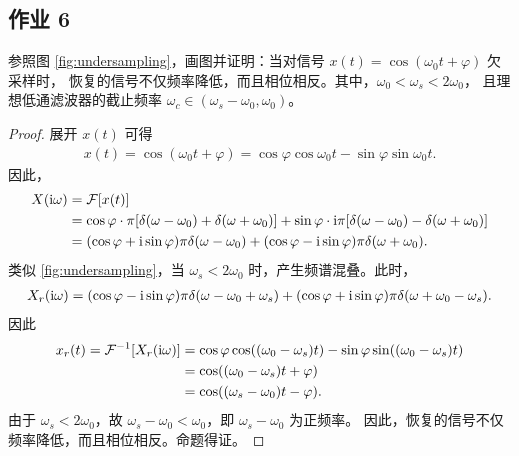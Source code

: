 \subsection{作业 6}

\begin{homework}
    参照图 \ref{fig:undersampling}，画图并证明：当对信号 $x(t) = \cos(\omega_0 t + \varphi)$ 欠采样时，
    恢复的信号不仅频率降低，而且相位相反。其中，$\omega_0 < \omega_s < 2\omega_0$，
    且理想低通滤波器的截止频率 $\omega_c \in (\omega_s - \omega_0, \omega_0)$。
\end{homework}

\begin{proof}
    展开 $x(t)$ 可得
    \begin{align*}
        x(t) = \cos(\omega_0 t + \varphi) = \cos\varphi\cos\omega_0 t- \sin\varphi \sin\omega_0 t.
    \end{align*}
    因此，
    \begin{align*}
        X(\mathrm{i}\omega) & = \mathcal{F}[x(t)] \\
        & = \cos\varphi\cdot \pi[\delta(\omega - \omega_0) + \delta(\omega + \omega_0)]
            + \sin\varphi\cdot \mathrm{i}\pi[\delta(\omega - \omega_0) - \delta(\omega + \omega_0)] \\
        & = (\cos\varphi + \mathrm{i}\sin\varphi)\pi\delta(\omega - \omega_0)
            + (\cos\varphi - \mathrm{i}\sin\varphi)\pi\delta(\omega + \omega_0).
    \end{align*}
    类似 \ref{fig:undersampling}，当 $\omega_s < 2\omega_0$ 时，产生频谱混叠。此时，
    \begin{align*}
        X_r(\mathrm{i}\omega) = (\cos\varphi - \mathrm{i}\sin\varphi)\pi\delta(\omega - \omega_0 + \omega_s)
            + (\cos\varphi + \mathrm{i}\sin\varphi)\pi\delta(\omega + \omega_0 - \omega_s).
    \end{align*}
    因此
    \begin{align*}
        x_r(t) = \mathcal{F}^{-1}[X_r(\mathrm{i}\omega)] & = \cos\varphi\cos((\omega_0 - \omega_s)t)
            - \sin\varphi\sin((\omega_0 - \omega_s)t) \\
        & = \cos((\omega_0 - \omega_s)t + \varphi) \\
        & = \cos((\omega_s - \omega_0)t - \varphi).
    \end{align*}
    由于 $\omega_s < 2\omega_0$，故 $\omega_s - \omega_0 < \omega_0$，即 $\omega_s - \omega_0$ 为正频率。
    因此，恢复的信号不仅频率降低，而且相位相反。命题得证。
\end{proof}

